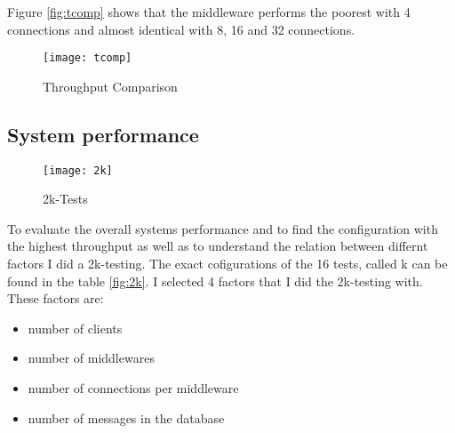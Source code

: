 \documentclass[
10pt, %
a4paper, %
oneside, %
headinclude,footinclude, %
BCOR5mm, %
]{scrartcl}
\begin{document}
Figure \vref{fig:tcomp} shows that the middleware performs the poorest with 4 connections and almost identical with 8, 16 and 32 connections. 

\begin{figure}[H]
\centering
\texttt{[image: tcomp]}
\caption{Throughput Comparison}
\label{fig:tcomp}
\end{figure}


\subsection{System performance}
\label{sec:2k}


\begin{sidewaysfigure}[h]
\centering
\texttt{[image: 2k]}
\caption{2k-Tests}
\label{fig:2k}
\end{sidewaysfigure}



To evaluate the overall systems performance and to find the configuration with the highest throughput as well as to understand the relation between differnt factors I did a 2k-testing. The exact cofigurations of the 16 tests, called k\* can be found in the table \vref{fig:2k}. I selected 4 factors that I did the 2k-testing with. These factors are:
\begin{itemize}
\item number of clients
\item number of middlewares
\item number of connections per middleware
\item number of messages in the database
\end{itemize}
\end{document}
